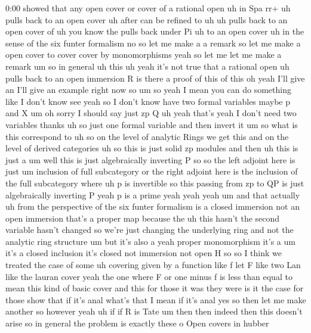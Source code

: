 \begin{unfinished}{0:00}
showed  that  any  open
cover  or  cover  of  a  rational
open
uh  in  Spa
rr+  uh  pulls
back  to  an  open
cover  uh  after  can  be  refined  to
uh  uh  pulls
back  to  an  open
cover  of  uh  you  know
the
pulls  back
under
Pi  uh  to  an  open
cover  uh  in  the  sense  of  the  six  funter
formalism
no  so  let  me  make  a  a  remark  so  let  me
make
a  open
cover  to
cover  cover  by  monomorphisms  yeah  so  let
me  let  me  make  a  remark  um  so  in
general  uh
this  uh  yeah  it's  not
true  that  a  rational
open  uh  pulls
back  to  an  open
immersion  R  is  there  a  proof  of  this  of
this  oh  yeah  I'll  give  an  I'll  give  an
example  right  now  so  um  so  yeah  I  mean
you  can  do  something  like  I  don't  know
see  yeah
so  I  don't
know  have  two  formal  variables  maybe  p
and  X
um  oh  sorry  I  should
say  just  zp  Q
uh  yeah  that's  yeah  I  don't  need  two
variables  thanks
uh  so  just  one  formal  variable  and  then
invert
it  um  so  what  is  this  correspond  to  uh
so  on  the  level  of  analytic  Rings  we  get
this  and  on  the  level  of  derived
categories
uh  so  this  is  just  solid  zp  modules  and
then  uh  this  is  just  a  um
well  this  is  just  algebraically
inverting  P  so  so  the  left  adjoint  here
is  just  um  inclusion  of  full  subcategory
or  the  right  adjoint  here  is  the
inclusion  of  the  full
subcategory  where  uh  p  is  invertible
so  this  passing  from  zp  to  QP  is  just
algebraically  inverting
P  yeah  p  is  a  prime  yeah  yeah  yeah  um
and  that  actually  uh  from  the
perspective  of  the  six  funter  formalism
is  a  closed  immersion  not  an  open
immersion  that's  a  proper  map  because
the  uh  this  hasn't  the  second  variable
hasn't  changed  so  we're  just  changing
the  underlying  ring  and  not  the  analytic
ring  structure
um  but  it's  also  a  yeah  proper
monomorphism  it's  a  um  it's  a  closed
inclusion  it's
closed  not  immersion  not
open  H  so  so  I  think  we  treated  the  case
of  some  uh  covering  given  by  a  function
like  f  let  F  like  two  Lan  like  the
lauran
cover  yeah  the  one  where  F  or  one  minus
f  is  less  than  equal  to  mean  this  kind
of  basic  cover  and  this  for  those  it  was
they  were  is  it  the  case  for  those  show
that  if  it's  anal  what's  that  I  mean  if
it's  anal  yes  so  then  let  me  make
another  so  however  yeah  uh  if  if  R  is
Tate  um  then  then  indeed  then  this
doesn't
arise  so  in  general  the  problem  is
exactly  these  o  Open  covers  in  hubber

\end{unfinished}
